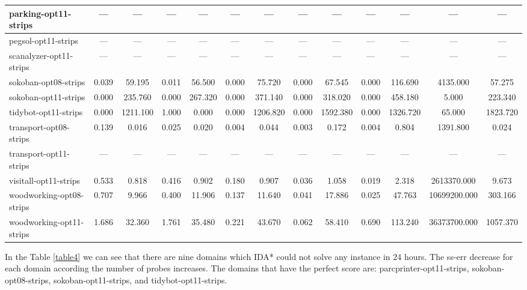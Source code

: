 \documentclass[a4paper,12pt]{article}
\begin{document}
\begin{table}[]
\begin{tabular}{l@{\hspace{4pt}} *{12}{c}}
parking-opt11-strips    & --- & --- & --- & --- & --- & --- & --- & --- & --- & --- & --- & --- \\ \hline
pegsol-opt11-strips     & --- & --- & --- & --- & --- & --- & --- & --- & --- & --- & --- & --- \\ \hline
scanalyzer-opt11-strips & --- & --- & --- & --- & --- & --- & --- & --- & --- & --- & --- & --- \\ \hline
sokoban-opt08-strips    & 0.039 & 59.195 & 0.011 & 56.500 & 0.000 & 75.720 & 0.000 & 67.545 & 0.000 & 116.690 & 4135.000 & 57.275 \\ \hline
sokoban-opt11-strips    & 0.000 & 235.760 & 0.000 & 267.320 & 0.000 & 371.140 & 0.000 & 318.020 & 0.000 & 458.180 & 5.000 & 223.340 \\ \hline
tidybot-opt11-strips    & 0.000 & 1211.100 & 1.000 & 0.000 & 0.000 & 1206.820 & 0.000 & 1592.380 & 0.000 & 1326.720 & 65.000 & 1823.720 \\ \hline
transport-opt08-strips  & 0.139 & 0.016 & 0.025 & 0.020 & 0.004 & 0.044 & 0.003 & 0.172 & 0.004 & 0.804 & 1391.800 & 0.024 \\ \hline
transport-opt11-strips  & --- & --- & --- & --- & --- & --- & --- & --- & --- & --- & --- & --- \\ \hline
visitall-opt11-strips   & 0.533 & 0.818 & 0.416 & 0.902 & 0.180 & 0.907 & 0.036 & 1.058 & 0.019 & 2.318 & 2613370.000 & 9.673 \\ \hline
woodworking-opt08-strips& 0.707 & 9.966 & 0.400 & 11.906 & 0.137 & 11.640 & 0.041 & 17.886 & 0.025 & 47.763 & 10699200.000 & 303.166 \\ \hline
woodworking-opt11-strips& 1.686 & 32.360 & 1.761 & 35.480 & 0.221 & 43.670 & 0.062 & 58.410 & 0.690 & 113.240 & 36373700.000 & 1057.370 \\ \hline
\end{tabular}
\end{table}

In the Table \ref{table4} we can see that there are nine domains which IDA* could not solve any instance in 24 hours. The ss-err decrease for each domain according the number of probes increases. The domains that have the perfect score are: parcprinter-opt11-strips, sokoban-opt08-strips, sokoban-opt11-strips, and tidybot-opt11-strips.

\newpage
\end{document}
